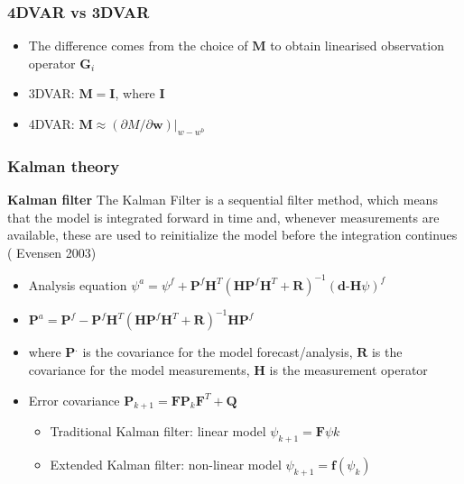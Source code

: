\documentclass{beamer}
\begin{document}
\begin{frame}
	\frametitle{4DVAR vs 3DVAR}
	\begin{itemize}
		\item The difference comes from the choice of $\mathbf{M}$ to obtain linearised observation operator $\mathbf {G}_{i}$
		\item 3DVAR: $\mathbf {M} = \mathbf {I}$, where $\mathbf {I}$
		\item 4DVAR: $\mathbf {M} \approx (\partial M/\partial \mathbf {w})|_{w-w^{b}}$
	\end{itemize}
\end{frame}


\begin{frame}
	\frametitle{Kalman theory}
	
	\begin{definition}
		\textbf{Kalman filter} The Kalman Filter is a sequential filter method, which
		means that the model is integrated forward in time and,
		whenever measurements are available, these are used to
		reinitialize the model before the integration continues ( Evensen 2003)
	\end{definition}
	
	\begin{itemize}
		\item Analysis equation $\psi ^{a} = \psi ^{f} + \textbf{P} ^{f}\textbf{H} ^{T}(\textbf{HP} ^{f}\textbf{H} ^{T}+\textbf{R}) ^{-1}(\textbf{d-H}\psi) ^{f}$
		\item $\textbf{P}^{a} = \textbf{P}^{f} - \textbf{P}^{f}\textbf{H}^{T}(\textbf{HP}^{f}\textbf{H}^{T}+\textbf{R})^{-1}\textbf{HP}^{f} $ 
		\item where  $\textbf{P}^{.}$ is the covariance for the model forecast/analysis,  $\textbf{R}$ is the covariance for the model measurements, $\textbf{H}$ is the measurement operator
		
	    \item Error covariance $\textbf{P}_{k+1}=\textbf{F}\textbf{P}_{k}\textbf{F}^{T}+\textbf{Q}$
	    \begin{itemize}
	    	\item Traditional Kalman filter: linear model $\psi_{k+1}=\textbf{F}\psi{k}$
	    	\item Extended Kalman filter: non-linear model
	    	$\psi_{k+1}=\textbf{f}(\psi_{k})$
	    	
	    \end{itemize}
	\end{itemize}
\end{frame}
\end{document}
